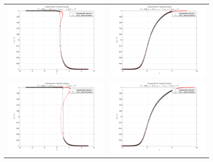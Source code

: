 \documentclass[11pt]{article}
\begin{document}
\begin{enumerate}
\begin{enumerate}
\begin{figure}[htp]
\begin{tabular}{cc}
	\includegraphics[width=3.4in]{Q2_1.png} & \includegraphics[width=3.4in]{Q2_2.png}\\
	\includegraphics[width=3.4in]{Q2_3.png} & \includegraphics[width=3.4in]{Q2_4.png}\\

\end{tabular}
\end{figure}
\end{enumerate}
\end{enumerate}
\end{document}
